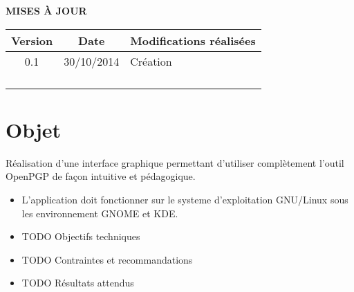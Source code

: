 \documentclass[a4paper,11pt,french]{article}
\begin{document}
\makeFirstPage
\clearpage

\vspace*{1cm}
\begin{center}
\textbf{\huge{MISES À JOUR}}\\
\vspace*{3cm}
	\begin{tabularx}{16cm}{|c|c|X|}
	\hline
	\bfseries{Version} & \bfseries{Date} & \bfseries{Modifications réalisées}\\
	\hline
	0.1 & 30/10/2014 & Création\\
	\hline
	 & &\\
	\hline
	 & & \\
	\hline
	&&\\
	\hline
	&&\\
	\hline
	\end{tabularx}
\end{center}

\clearpage
\tableofcontents
\clearpage

\section{Objet}

Réalisation d'une interface graphique permettant d'utiliser complètement l'outil OpenPGP
de façon intuitive et pédagogique.

\begin{itemize}
\item L'application doit fonctionner sur le systeme d'exploitation GNU/Linux
  sous les environnement GNOME et KDE.
\item TODO Objectifs techniques%
\item TODO Contraintes et recommandations %
\item TODO Résultats attendus %
\end{itemize}
\end{document}

